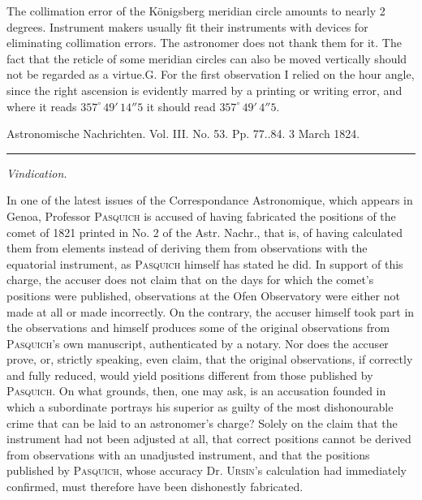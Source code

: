 \clearpage
{}
\hypertarget{native-639-lower}{}
\expandafter\def\csname HistoricalNoteText35\endcsname{The collimation error of the Königsberg meridian circle amounts to nearly 2 degrees. Instrument makers usually fit their instruments with devices for eliminating collimation errors. The astronomer does not thank them for it. The fact that the reticle of some meridian circles can also be moved vertically should not be regarded as a virtue.\hfill G.}
\expandafter\def\csname HistoricalNoteText36\endcsname{For the first observation I relied on the hour angle, since the right ascension is evidently marred by a printing or writing error, and where it reads $357^\circ\,49'\,14''5$ it should read $357^\circ\,49'\,4''5$.}
\begin{center}\small Astronomische Nachrichten. Vol. III. No. 53. Pp. 77..84. 3 March 1824.\\[3pt]\rule{.72\linewidth}{.3pt}\end{center}
\begin{center}\emph{Vindication.}\end{center}

In one of the latest issues of the Correspondance Astronomique, which appears in Genoa, Professor \textsc{Pasquich} is accused of having fabricated the positions of the comet of 1821 printed in No. 2 of the Astr. Nachr., that is, of having calculated them from elements instead of deriving them from observations with the equatorial instrument, as \textsc{Pasquich} himself has stated he did. In support of this charge, the accuser does not claim that on the days for which the comet's positions were published, observations at the Ofen Observatory were either not made at all or made incorrectly. On the contrary, the accuser himself took part in the observations and himself produces some of the original observations from \textsc{Pasquich}'s own manuscript, authenticated by a notary. Nor does the accuser prove, or, strictly speaking, even claim, that the original observations, if correctly and fully reduced, would yield positions different from those published by \textsc{Pasquich}. On what grounds, then, one may ask, is an accusation founded in which a subordinate portrays his superior as guilty of the most dishonourable crime that can be laid to an astronomer's charge? Solely on the claim that the instrument had not been adjusted at all, that correct positions cannot be derived from observations with an unadjusted instrument, and that the positions published by \textsc{Pasquich}, whose accuracy Dr. \textsc{Ursin}'s calculation had immediately confirmed, must therefore have been dishonestly fabricated.

